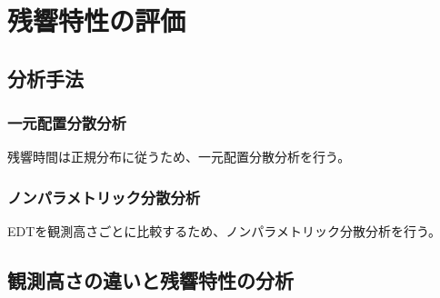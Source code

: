 \chapter{残響特性の評価}
\section{分析手法}
\subsection{一元配置分散分析}
残響時間は正規分布に従うため、一元配置分散分析を行う。
\subsection{ノンパラメトリック分散分析}
EDTを観測高さごとに比較するため、ノンパラメトリック分散分析を行う。
\section{観測高さの違いと残響特性の分析}

